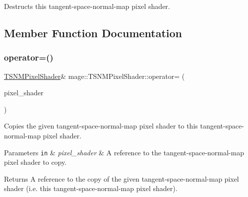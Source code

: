 Destructs this tangent-\/space-\/normal-\/map pixel shader. 

\subsection{Member Function Documentation}
\hypertarget{classmage_1_1_t_s_n_m_pixel_shader_a8c9bc92d544b088e9530f8f47df2b4a6}{}\label{classmage_1_1_t_s_n_m_pixel_shader_a8c9bc92d544b088e9530f8f47df2b4a6} 
\subsubsection{\texorpdfstring{operator=()}{operator=()}\hspace{0.1cm}{\footnotesize\ttfamily [1/2]}}
{\footnotesize\ttfamily \hyperlink{classmage_1_1_t_s_n_m_pixel_shader}{T\+S\+N\+M\+Pixel\+Shader}\& mage\+::\+T\+S\+N\+M\+Pixel\+Shader\+::operator= (\begin{DoxyParamCaption}\item[{const \hyperlink{classmage_1_1_t_s_n_m_pixel_shader}{T\+S\+N\+M\+Pixel\+Shader} \&}]{pixel\+\_\+shader }\end{DoxyParamCaption})\hspace{0.3cm}{\ttfamily [delete]}}

Copies the given tangent-\/space-\/normal-\/map pixel shader to this tangent-\/space-\/normal-\/map pixel shader.


\begin{DoxyParams}[1]{Parameters}
\mbox{\tt in}  & {\em pixel\+\_\+shader} & A reference to the tangent-\/space-\/normal-\/map pixel shader to copy. \\
\hline
\end{DoxyParams}
\begin{DoxyReturn}{Returns}
A reference to the copy of the given tangent-\/space-\/normal-\/map pixel shader (i.\+e. this tangent-\/space-\/normal-\/map pixel shader). 
\end{DoxyReturn}
\hypertarget{classmage_1_1_t_s_n_m_pixel_shader_a0d714c73017f9bb9b273b2d2a276ab5f}{}\label{classmage_1_1_t_s_n_m_pixel_shader_a0d714c73017f9bb9b273b2d2a276ab5f} 
